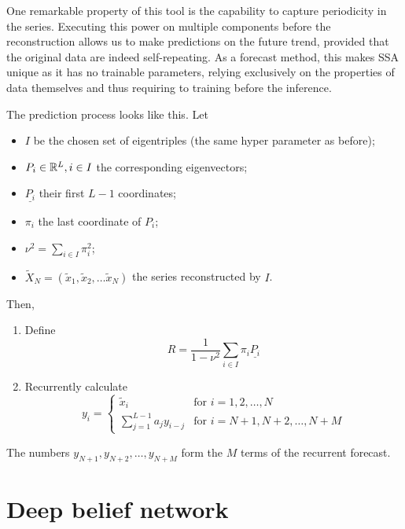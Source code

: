 One remarkable property of this tool is the capability to capture periodicity in
the series. Executing this power on multiple components before the
reconstruction allows us to make predictions on the future trend, provided that
the original data are indeed self-repeating. As a forecast method, this makes
SSA unique as it has no trainable parameters, relying exclusively on the
properties of data themselves and thus requiring to training before the 
inference.

\begin{samepage}
	The prediction process looks like this. Let
	\begin{itemize}
		\item $I$ be the chosen set of eigentriples (the same hyper parameter as 
		before);
		\item $P_i\in\mathbb{R}^L,\space i\in I$ the corresponding eigenvectors;
		\item $\underline{P_i}$ their first $L-1$ coordinates;
		\item $\pi_i$ the last coordinate of $P_i$;
		\item $\nu^2=\sum_{i\in I}\pi_i^2$;
		\item $\tilde{X}_N=(\tilde{x}_1,\tilde{x}_2,\ldots\tilde{x}_N)$ the series 
		reconstructed by $I$.
	\end{itemize}
\end{samepage}
Then,
\begin{enumerate}
	\item Define
	\begin{equation}
		R=\frac{1}{1-\nu^2}\sum_{i\in I}\pi_i\underline{P_i}
		\label{eq:R_ssa}
	\end{equation}
	\item Recurrently calculate
	\begin{equation}
		y_i=
		\begin{cases}
			\tilde{x}_i & \text{for }i=1,2,\ldots,N \\
			\sum_{j=1}^{L-1}a_jy_{i-j} & \text{for } i=N+1,N+2,\ldots,N+M
		\end{cases}
		\label{eq:y_i_ssa}
	\end{equation}
\end{enumerate}
The numbers  $y_{N+1},y_{N+2},\ldots,y_{N+M}$ form the $M$ terms of the
recurrent forecast.


\section{Deep belief network}

